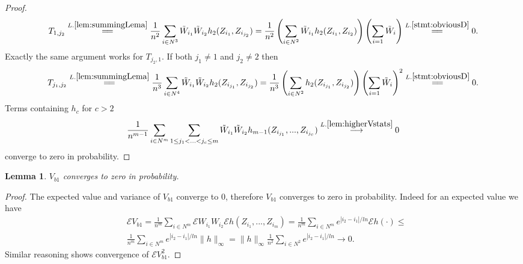 \documentclass{article} %
\newtheorem{lemma}{Lemma}
\newcommand{\ev}{\mathcal{E}}
\begin{document}
\begin{proof}
\begin{align}
T_{1,j_2} \overset{L.\ref{lem:summingLema}}{=\joinrel=} \frac{1} {n^2}  \sum_{i \in N^3}  \tilde W_{i_1} \tilde W_{i_2} h_2(Z_{i_1},Z_{i_{j_2}}) = \frac{1} {n^2} \left( \sum_{i \in N^2}  \tilde W_{i_1}  h_2(Z_{i_1},Z_{i_2}) \right) \left( \sum_{i=1} \tilde W_i \right)  \overset{L.\ref{stmt:obviousD}}{=\joinrel=} 0.
\end{align}
Exactly the same argument works for $T_{j_2,1}$. If both $j_1 \neq 1$ and $j_2 \neq 2$ then 
\begin{align}
T_{j_1,j_2} \overset{L.\ref{lem:summingLema}}{=\joinrel=} \frac{1} {n^3}  \sum_{i \in N^4}  \tilde W_{i_1} \tilde W_{i_2} h_2(Z_{i_{j_1}},Z_{i_{j_2}}) = \frac{1} {n^3} \left( \sum_{i \in N^2}   h_2(Z_{i_{j_1}},Z_{i_{j_2}})\right) \left( \sum_{i=1} \tilde W_i \right)^2 \overset{L.\ref{stmt:obviousD}}{=\joinrel=}0.
\end{align}   
Terms containing $h_c$ for $c>2$ 
\begin{align}
\frac{1} {n^{m-1}}  \sum_{i \in N^m} \sum_{1 \leq j_1 < ...<j_{c} \leq m } \tilde W_{i_1} \tilde W_{i_2}  h_{m-1}(Z_{i_{j_1}},...,Z_{i_{j_{c}}}) \overset{L. \ref{lem:higherVstats}}{\longrightarrow} 0 
\end{align}
converge to zero in probability.
 \end{proof}
  
\begin{lemma}
\label{lem:degb2}
$ V_{b1}$ converges to zero in probability.  
\end{lemma}  
\begin{proof}
The expected value and variance of $V_{b1}$ converge to 0, therefore $V_{b1}$ converges to zero in probability. Indeed for an expected value we have
\begin{align}
& \ev V_{b1} = \frac {1} {n^m} \sum_{i \in N^m} \ev W_{i_1} W_{i_2} \ev h(Z_{i_1},...,Z_{i_m}) =  \frac {1} {n^m} \sum_{i \in N^m}  e^{|i_2-i_1|/ln} \ev h(\cdot) \leq   \\
&\frac {1} {n^m} \sum_{i \in N^m}  e^{|i_2-i_1|/ln} \parallel h \parallel_{\infty} =  \parallel h \parallel_{\infty} \frac {1} {n^2} \sum_{i \in N^2}  e^{|i_2-i_1|/ln}  \to 0.
\end{align}
Similar reasoning shows convergence of $\ev V_{b1}^2$.
\end{proof}  
  
\end{document}

